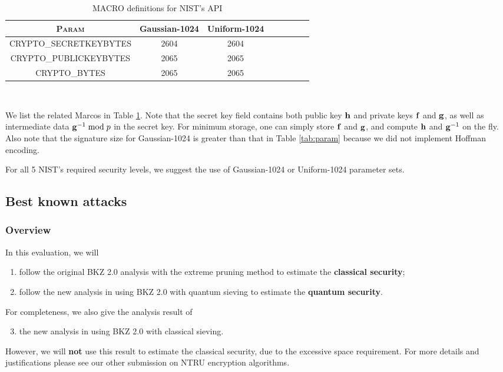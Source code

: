 \documentclass{llncs}
\newcommand{\bff}{{\bf f}}
\newcommand{\bfg}{{\bf g}}
\newcommand{\bfh}{{\bf h}}
\newcommand{\<}{\langle}
\renewcommand{\>}{\rangle}
\begin{document}
\begin{table}
\centering
\caption{MACRO definitions for NIST's API}
\label{tab:macro}
\begin{tabular}{|c||c|c|c|c|c|c|c|}\hline
\textsc{Param} & 
\textsf{Gaussian-1024}  & \textsf{Uniform-1024}
\\\hline
CRYPTO\_SECRETKEYBYTES & 2604 & 2604\\

CRYPTO\_PUBLICKEYBYTES &2065&2065 \\
CRYPTO\_BYTES &2065&2065 \\\hline
\end{tabular}\\ 
\end{table}
We list the related Marcos in Table \ref{tab:macro}. 
Note that the secret key field contains both public key $\bfh$ and private
keys $\bff$ and $\bfg$, as well as intermediate
data $\bfg^{-1} \bmod p$ in the secret key.
For minimum storage, one can simply store $\bff$ and $\bfg$, and compute $\bfh$ and $\bfg^{-1}$ on the fly.
Also note that the signature size for \textsf{Gaussian-1024}
is greater than that in Table \ref{tab:param} because
we did not implement Hoffman encoding.

For all 5 NIST's required security levels, we
suggest the use of \textsf{Gaussian-1024} or \textsf{Uniform-1024} parameter sets.




\subsection{Best known attacks}\label{sec:known_attack_security}
\subsubsection{Overview}
In this evaluation, we will
\begin{enumerate}


\item follow the original BKZ 2.0 analysis \cite{BKZ2} with the extreme pruning method to estimate
the {\bf classical security};
\item follow the new analysis in \cite{newhope} using BKZ 2.0 with quantum sieving to estimate
the {\bf quantum security}.
\end{enumerate}
\noindent
For completeness, we also give the analysis result
of 
\begin{enumerate}
\setcounter{enumi}{2}
\item   the new analysis in \cite{newhope} using BKZ 2.0 with classical sieving.
\end{enumerate}
However, we will {\bf not} use this result to estimate the classical security, due to the excessive
space requirement. For more details and justifications please see our other
submission on NTRU encryption algorithms.
\end{document}

